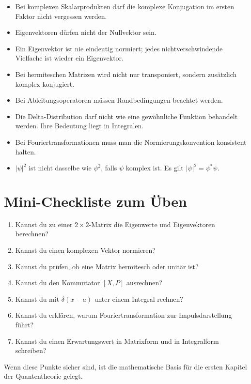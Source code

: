 \begin{examtipbox}
\begin{itemize}
    \item Bei komplexen Skalarprodukten darf die komplexe Konjugation im ersten Faktor nicht vergessen werden.
    \item Eigenvektoren dürfen nicht der Nullvektor sein.
    \item Ein Eigenvektor ist nie eindeutig normiert; jedes nichtverschwindende Vielfache ist wieder ein Eigenvektor.
    \item Bei hermiteschen Matrizen wird nicht nur transponiert, sondern zusätzlich komplex konjugiert.
    \item Bei Ableitungsoperatoren müssen Randbedingungen beachtet werden.
    \item Die Delta-Distribution darf nicht wie eine gewöhnliche Funktion behandelt werden. Ihre Bedeutung liegt in Integralen.
    \item Bei Fouriertransformationen muss man die Normierungskonvention konsistent halten.
    \item $|\psi|^2$ ist nicht dasselbe wie $\psi^2$, falls $\psi$ komplex ist. Es gilt $|\psi|^2=\psi^*\psi$.
\end{itemize}
\end{examtipbox}

\section{Mini-Checkliste zum Üben}

\begin{enumerate}[label=\arabic*)]
    \item Kannst du zu einer $2\times2$-Matrix die Eigenwerte und Eigenvektoren berechnen?
    \item Kannst du einen komplexen Vektor normieren?
    \item Kannst du prüfen, ob eine Matrix hermitesch oder unitär ist?
    \item Kannst du den Kommutator $[X,P]$ ausrechnen?
    \item Kannst du mit $\delta(x-a)$ unter einem Integral rechnen?
    \item Kannst du erklären, warum Fouriertransformation zur Impulsdarstellung führt?
    \item Kannst du einen Erwartungswert in Matrixform und in Integralform schreiben?
\end{enumerate}

Wenn diese Punkte sicher sind, ist die mathematische Basis für die ersten Kapitel der Quantentheorie gelegt.
